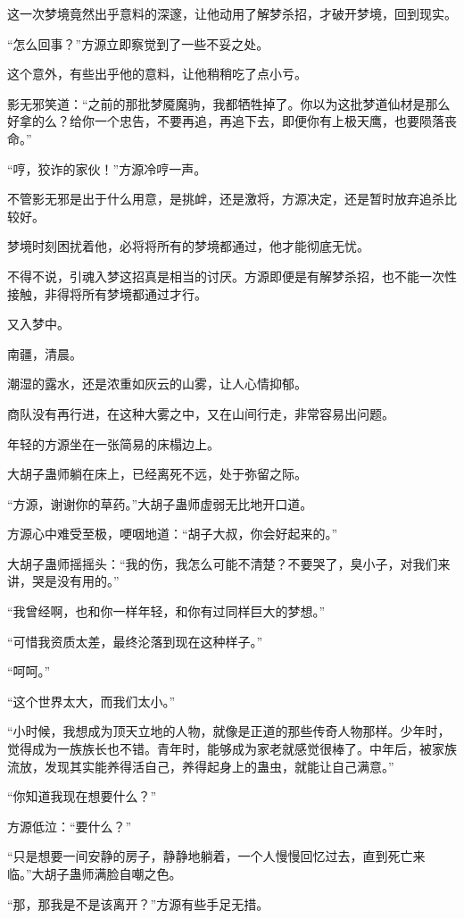 \begin{this_body}
这一次梦境竟然出乎意料的深邃，让他动用了解梦杀招，才破开梦境，回到现实。

“怎么回事？”方源立即察觉到了一些不妥之处。

这个意外，有些出乎他的意料，让他稍稍吃了点小亏。

影无邪笑道：“之前的那批梦魇魔驹，我都牺牲掉了。你以为这批梦道仙材是那么好拿的么？给你一个忠告，不要再追，再追下去，即便你有上极天鹰，也要陨落丧命。”

“哼，狡诈的家伙！”方源冷哼一声。

不管影无邪是出于什么用意，是挑衅，还是激将，方源决定，还是暂时放弃追杀比较好。

梦境时刻困扰着他，必将将所有的梦境都通过，他才能彻底无忧。

不得不说，引魂入梦这招真是相当的讨厌。方源即便是有解梦杀招，也不能一次性接触，非得将所有梦境都通过才行。

又入梦中。

南疆，清晨。

潮湿的露水，还是浓重如灰云的山雾，让人心情抑郁。

商队没有再行进，在这种大雾之中，又在山间行走，非常容易出问题。

年轻的方源坐在一张简易的床榻边上。

大胡子蛊师躺在床上，已经离死不远，处于弥留之际。

“方源，谢谢你的草药。”大胡子蛊师虚弱无比地开口道。

方源心中难受至极，哽咽地道：“胡子大叔，你会好起来的。”

大胡子蛊师摇摇头：“我的伤，我怎么可能不清楚？不要哭了，臭小子，对我们来讲，哭是没有用的。”

“我曾经啊，也和你一样年轻，和你有过同样巨大的梦想。”

“可惜我资质太差，最终沦落到现在这种样子。”

“呵呵。”

“这个世界太大，而我们太小。”

“小时候，我想成为顶天立地的人物，就像是正道的那些传奇人物那样。少年时，觉得成为一族族长也不错。青年时，能够成为家老就感觉很棒了。中年后，被家族流放，发现其实能养得活自己，养得起身上的蛊虫，就能让自己满意。”

“你知道我现在想要什么？”

方源低泣：“要什么？”

“只是想要一间安静的房子，静静地躺着，一个人慢慢回忆过去，直到死亡来临。”大胡子蛊师满脸自嘲之色。

“那，那我是不是该离开？”方源有些手足无措。


\end{this_body}
